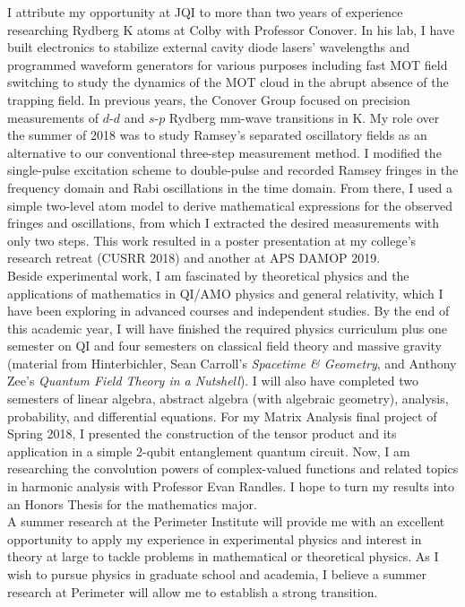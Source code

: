 \documentclass[10pt]{article}
\begin{document}
I attribute my opportunity at JQI to more than two years of experience researching Rydberg K atoms at Colby with Professor  Conover. In his lab, I have built electronics to stabilize external cavity diode lasers' wavelengths and programmed waveform generators for various purposes including fast MOT field switching to study the dynamics of the MOT cloud in the abrupt absence of the trapping field. In previous years, the Conover Group focused on precision measurements of $d$-$d$ and $s$-$p$ Rydberg mm-wave transitions in K. My role over the summer of 2018 was to study Ramsey's separated oscillatory fields as an alternative to our conventional three-step measurement method. I modified the single-pulse excitation scheme to double-pulse and recorded Ramsey fringes in the frequency domain and Rabi oscillations in the time domain. From there, I used a simple two-level atom model to derive mathematical expressions for the observed fringes and oscillations, from which I extracted the desired measurements with only two steps. This work resulted in a poster presentation at my college's research retreat (CUSRR 2018) and another at APS DAMOP 2019.  \\


Beside experimental work, I am fascinated by theoretical physics and the applications of mathematics in QI/AMO physics and general relativity, which I have been exploring in advanced courses and independent studies. By the end of this academic year, I will have finished the required physics curriculum plus one semester on QI and four semesters on classical field theory and massive gravity (material from Hinterbichler\cite{RevModPhys.84.671}, Sean Carroll's \textit{Spacetime \& Geometry}, and Anthony Zee's \textit{Quantum Field Theory in a Nutshell}). I will also have completed two semesters of linear algebra, abstract algebra (with algebraic geometry), analysis, probability, and differential equations. For my Matrix Analysis final project of Spring 2018, I presented the construction of the tensor product and its application in a simple 2-qubit entanglement quantum circuit. Now, I am researching the convolution powers of complex-valued functions and related topics in harmonic analysis with Professor Evan Randles. I hope to turn my results into an Honors Thesis for the mathematics major. \\

  
A summer research at the Perimeter Institute will provide me with an excellent opportunity to apply my experience in experimental physics and interest in theory at large to tackle problems in mathematical or theoretical physics. As I wish to pursue physics in graduate school and academia, I believe a summer research at Perimeter will allow me to establish a strong transition.










 

















	
	
	
	
	
\end{document}
